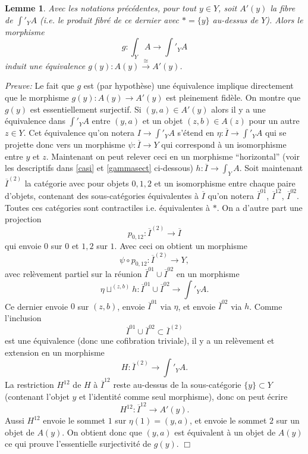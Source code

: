 \documentclass[12pt]{article}
\newcommand{\eop}{\hfill $\Box$\vspace{.1in}}
\newtheorem{lemme}[lemma]{Lemme}
\begin{document}
\begin{lemme}
\label{inchange}
Avec les notations pr\'ec\'edentes, pour tout $y\in Y$, soit $A'(y)$ la fibre de
$\int '_YA$ (i.e. le produit fibr\'e de ce dernier avec $\ast = \{ y\}$
au-dessus de $Y$). Alors le morphisme
$$
g:\int _YA\rightarrow \int '_YA
$$
induit une \'equivalence $g(y): A(y)\stackrel{\cong}{\rightarrow} A'(y)$.
\end{lemme}
{\em Preuve:}
Le fait que $g$ est (par hypoth\`ese) une \'equivalence implique
directement que le morphisme $g(y):A(y)\rightarrow A'(y)$ est pleinement
fid\`ele. On montre que $g(y)$ est essentiellement surjectif.
Si $(y,a)\in A'(y)$ alors il y a une \'equivalence dans $\int '_YA$ entre
$(y,a)$ et un objet $(z,b)\in A(z)$ pour un autre $z\in Y$. Cet \'equivalence
qu'on notera $I\rightarrow \int '_YA$ s'\'etend en $\eta :
\overline{I}\rightarrow \int '_YA$ qui se projette donc vers un morphisme
$\psi :
\overline{I}\rightarrow Y$ qui correspond \`a un isomorphisme entre $y$ et $z$.
Maintenant on peut relever ceci en un morphisme ``horizontal'' (voir les
descriptifs dans \ref{casi} et \ref{gammasect} ci-dessous)
$h:\overline{I}\rightarrow \int _YA$. Soit maintenant  $\overline{I}^{(2)}$ la
cat\'egorie avec pour objets $0,1,2$ et un isomorphisme entre chaque paire
d'objets,
contenant des sous-cat\'egories \'equivalentes \`a $\overline{I}$ qu'on notera
$\overline{I}^{01}$, $\overline{I}^{12}$, $\overline{I}^{02}$. Toutes ces
cat\'egories sont contractiles i.e. \'equivalentes \`a $\ast$. On a d'autre part
une projection
$$
p_{0,12}: \overline{I}^{(2)}\rightarrow \overline{I}
$$
qui envoie $0$ sur $0$ et $1,2$ sur $1$. Avec ceci on obtient un morphisme
$$
\psi \circ p_{0,12}: \overline{I}^{(2)}\rightarrow Y,
$$
avec rel\`evement partiel sur la r\'eunion $\overline{I}^{01}\cup
\overline{I}^{02}$ en un morphisme
$$
\eta \sqcup ^{(z,b)}h: \overline{I}^{01}\cup
\overline{I}^{02}\rightarrow \int '_YA.
$$
Ce dernier envoie $0$ sur $(z,b)$, envoie $\overline{I}^{01}$ via $\eta$, et
envoie $\overline{I}^{02}$ via $h$.  Comme l'inclusion
$$
\overline{I}^{01}\cup
\overline{I}^{02}\subset
\overline{I}^{(2)}
$$
est une \'equivalence (donc une cofibration triviale), il y a un rel\`evement
et extension en un morphisme
$$
H: \overline{I}^{(2)}\rightarrow \int '_YA.
$$
La restriction $H^{12}$ de $H$ \`a $\overline{I}^{12}$ reste au-dessus de la
sous-cat\'egorie $\{ y\} \subset Y$ (contenant l'objet $y$ et l'identit\'e
comme seul morphisme), donc on peut \'ecrire
$$
H^{12}: \overline{I}^{12}\rightarrow A'(y).
$$
Aussi $H^{12}$ envoie
le sommet $1$ sur $\eta (1)= (y,a)$, et envoie le sommet $2$ sur un objet de
$A(y)$. On obtient donc que $(y,a)$ est \'equivalent \`a un objet de $A(y)$ ce
qui prouve l'essentielle surjectivit\'e de $g(y)$.
\eop
\end{document}
